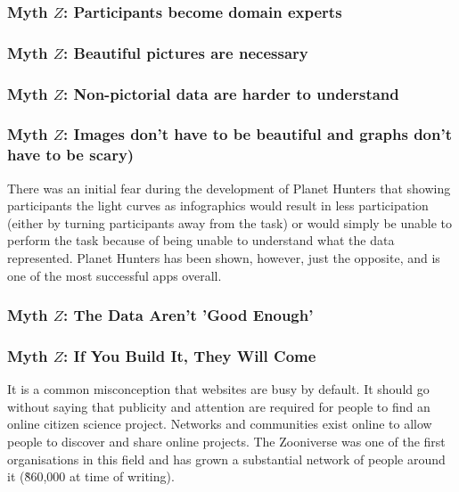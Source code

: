 \documentclass{sigchi}
\begin{document}
\subsubsection{Myth $Z$: Participants become domain experts}
\subsubsection{Myth $Z$: Beautiful pictures are necessary}
\subsubsection{Myth $Z$: Non-pictorial data are harder to understand}
\subsubsection{Myth $Z$: Images don't have to be beautiful and graphs don't have to be scary)}
There was an initial fear during the development of Planet Hunters that showing participants the light curves as infographics would result in less participation (either by turning participants away from the task) or would simply be unable to perform the task because of being unable to understand what the data represented.  Planet Hunters has been shown, however, just the opposite, and is one of the most successful apps overall.  
\subsubsection{Myth $Z$: The Data Aren't 'Good Enough'}
\subsubsection{Myth $Z$: If You Build It, They Will Come}

It is a common misconception that websites are busy by default. It should go without saying that publicity and attention are required for people to find an online citizen science project. Networks and communities exist online to allow people to discover and share online projects. The Zooniverse was one of the first organisations in this field and has grown a substantial network of people around it (\~860,000 at time of writing).
\end{document}

